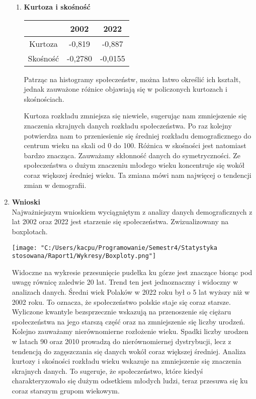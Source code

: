 \documentclass{article}
\begin{document}
\begin{enumerate}
\begin{enumerate}[label*=\arabic*.]
			
			\item \textbf{Kurtoza i skośność}\\
			\begin{table}[htpb]
				\centering
				\begin{tabular}{|c|c|c|}
					\hline
					\cellcolor{gray!40}    & 2002 & 2022 \\
					\hline
					Kurtoza & -0,819 & -0,887 \\
					\hline
					Skośność & -0,2780 & -0,0155 \\
					\hline
				\end{tabular}
			\end{table}
			
			Patrząc na histogramy społeczeństw, można łatwo określić ich kształt, jednak zauważone różnice objawiają się w policzonych kurtozach i skośnościach.

			Kurtoza rozkładu zmniejsza się niewiele, sugerując nam zmniejszenie się znaczenia skrajnych danych rozkładu społeczeństwa. Po raz kolejny potwierdza nam to przeniesienie się średniej rozkładu demograficznego do centrum wieku na skali od 0 do 100. Różnica w skośności jest natomiast bardzo znacząca. Zauważamy skłonność danych do symetryczności. Ze społeczeństwa o dużym znaczeniu młodego wieku koncentruje się wokół coraz większej średniej wieku. Ta zmiana mówi nam najwięcej o tendencji zmian w demografii.  
			
		\end{enumerate}
		
		\item \textbf{Wnioski}\\
		Najważniejszym wnioskiem wyciągniętym z analizy danych demograficznych z lat 2002 oraz 2022 jest starzenie się społeczeństwa. Zwizualizowany na boxplotach.
		
		\texttt{[image: "C:/Users/kacpu/Programowanie/Semestr4/Statystyka stosowana/Raport1/Wykresy/Boxploty.png"]}
		
		Widoczne na wykresie przesunięcie pudełka ku górze jest znaczące biorąc pod uwagę równicę zaledwie 20 lat.
		Trend ten jest jednoznaczny i widoczny w analizach danych. Średni wiek Polaków w 2022 roku był o 5 lat wyższy niż w 2002 roku. To oznacza, że społeczeństwo polskie staje się coraz starsze. 
		Wyliczone kwantyle bezsprzecznie wskazują na przenoszenie się ciężaru społeczeństwa na jego starszą część oraz na zmniejszenie się liczby urodzeń. Kolejno zauważamy nierównomierne rozłożenie wieku. Spadki liczby urodzen w latach 90 oraz 2010 prowadzą do nierównomiernej dystrybucji, lecz z tendencją do zagęszczania się danych wokół coraz większej średniej. Analiza kurtozy i skośności rozkładu wieku wskazuje na zmniejszenie się znaczenia skrajnych danych. To sugeruje, że społeczeństwo, które kiedyś charakteryzowało się dużym odsetkiem młodych ludzi, teraz przesuwa się ku coraz starszym grupom wiekowym.
		
	\end{enumerate}
	
\end{document}
